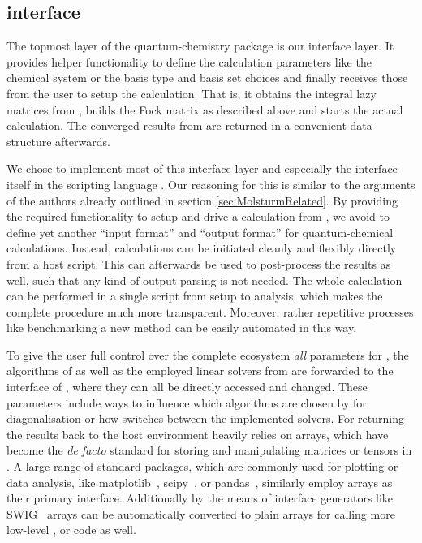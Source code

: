 \subsection{\molsturm \python interface}
\label{sec:MolsturmPython}

The topmost layer of the \molsturm quantum-chemistry
package is our interface layer.
It provides helper functionality to
define the calculation parameters like the chemical system
or the basis type and basis set choices
and finally receives those from the user
to setup the calculation.
That is, it obtains the integral lazy matrices
from \gint, builds the Fock matrix
as described above and starts the actual \SCF calculation.
The converged results from \gscf are
returned in a convenient data structure afterwards.

We chose to implement most of this interface layer
and especially the interface itself
in the scripting language \python.
Our reasoning for this is similar to the arguments
of the \pyscf authors already outlined in section \ref{sec:MolsturmRelated}.
By providing the required functionality to setup and drive
a \molsturm calculation from \python,
we avoid to define yet another ``input format'' and ``output format''
for quantum-chemical calculations.
Instead, calculations can be initiated cleanly and flexibly
directly from a host script.
This can afterwards be used to post-process the results as well,
such that any kind of output parsing is not needed.
The whole calculation can be performed in a single script
from setup to analysis,
which makes the complete procedure much more transparent.
Moreover, rather repetitive processes like
benchmarking a new method
can be easily automated in this way.

To give the user full control over the complete \molsturm ecosystem
\emph{all} parameters for \gint, the \SCF algorithms of \gscf
as well as the employed linear solvers from \lazyten are forwarded
to the \python interface of \molsturm,
where they can all be directly accessed and changed.
These parameters include ways to influence which algorithms are
chosen by \lazyten for diagonalisation
or how \gint switches between the implemented \SCF solvers.
For returning the \SCF results back to the host environment \molsturm
heavily relies on \numpy arrays,
which have become the \textit{de facto} standard
for storing and manipulating matrices or tensors in \python.
A large range of standard \python packages,
which are commonly used for plotting or data analysis,
like matplotlib~\cite{Matplotlib}, scipy~\cite{Walt2011,scipyWeb},
or pandas~\cite{pandasWeb},
similarly employ \numpy arrays as their primary interface.
Additionally by the means of interface generators like SWIG~
\numpy arrays can be automatically converted to plain
\ccc arrays for calling more low-level \cpp, \ccc or \fortran code as well.

